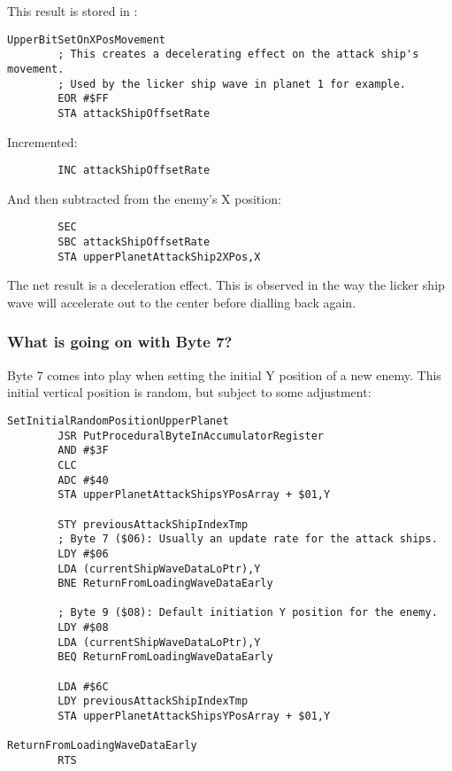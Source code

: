 This result is stored in :
\begin{lstlisting}
UpperBitSetOnXPosMovement   
        ; This creates a decelerating effect on the attack ship's movement.
        ; Used by the licker ship wave in planet 1 for example.
        EOR #$FF
        STA attackShipOffsetRate
\end{lstlisting}

Incremented:
\begin{lstlisting}
        INC attackShipOffsetRate
\end{lstlisting}

And then subtracted from the enemy's X position:
\begin{lstlisting}
        SEC
        SBC attackShipOffsetRate
        STA upperPlanetAttackShip2XPos,X
\end{lstlisting}

The net result is a deceleration effect. This is observed in the way the licker ship
wave will accelerate out to the center before dialling back again.


\subsubsection{What is going on with Byte 7?}

Byte 7 comes into play when setting the initial Y position of a new enemy. This initial vertical
position is random, but subject to some adjustment:

\begin{lstlisting}[caption=The sub-routine \icode{SetInitialRandomPositionUpperPlanet} in \icode{GetWaveDateForNewShip}.  ]
SetInitialRandomPositionUpperPlanet   
        JSR PutProceduralByteInAccumulatorRegister
        AND #$3F
        CLC
        ADC #$40
        STA upperPlanetAttackShipsYPosArray + $01,Y

        STY previousAttackShipIndexTmp
        ; Byte 7 ($06): Usually an update rate for the attack ships.
        LDY #$06
        LDA (currentShipWaveDataLoPtr),Y
        BNE ReturnFromLoadingWaveDataEarly

        ; Byte 9 ($08): Default initiation Y position for the enemy. 
        LDY #$08
        LDA (currentShipWaveDataLoPtr),Y
        BEQ ReturnFromLoadingWaveDataEarly

        LDA #$6C
        LDY previousAttackShipIndexTmp
        STA upperPlanetAttackShipsYPosArray + $01,Y

ReturnFromLoadingWaveDataEarly   
        RTS
\end{lstlisting}

